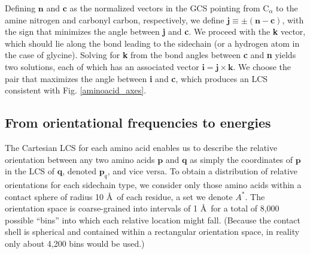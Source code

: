 \documentclass[11pt,titlepage]{article}
\begin{document}
Defining $\textbf{n}$ and $\textbf{c}$ as the normalized vectors in the GCS pointing from C$_\alpha$ to the amine nitrogen and carbonyl carbon, respectively, we define $\textbf{j} \equiv \pm(\textbf{n} - \textbf{c})$, with the sign that minimizes the angle between \textbf{j} and \textbf{c}.
We proceed with the \textbf{k} vector, which should lie along the bond leading to the sidechain (or a hydrogen atom in the case of glycine).
Solving for \textbf{k} from the bond angles between \textbf{c} and \textbf{n} yields two solutions, each of which has an associated vector $\textbf{i}=\textbf{j}\times\textbf{k}$.
We choose the pair that maximizes the angle between \textbf{i} and \textbf{c}, which produces an LCS consistent with Fig. \ref{aminoacid_axes}.

\subsection{From orientational frequencies to energies}
The Cartesian LCS for each amino acid enables us to describe the relative orientation between any two amino acids $\textbf{p}$ and $\textbf{q}$ as simply the coordinates of $\textbf{p}$ in the LCS of $\textbf{q}$, denoted $\textbf{p}_q$, and vice versa.
To obtain a distribution of relative orientations for each sidechain type, we consider only those amino acids within a contact sphere of radius 10 \AA\, of each residue, a set we denote $A^*$.
The orientation space is coarse-grained into intervals of 1 \AA\, for a total of 8,000 possible ``bins'' into which each relative location might fall. (Because the contact shell is spherical and contained within a rectangular orientation space, in reality only about 4,200 bins would be used.)
\end{document}
